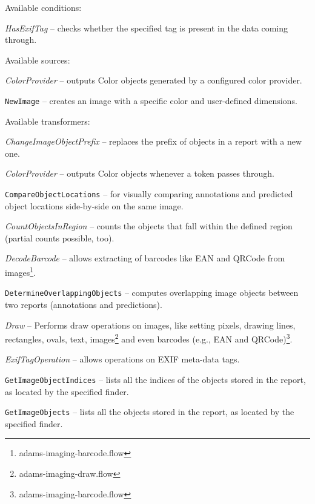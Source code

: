 \documentclass[a4paper]{book}
\begin{document}
\noindent Available conditions:
\begin{tight_itemize}
  \item \textit{HasExifTag} -- checks whether the specified tag is present in
  the data coming through.
\end{tight_itemize}

\noindent Available sources:
\begin{tight_itemize}
  \item \textit{ColorProvider} -- outputs Color objects generated by a
  configured color provider.
  \item \texttt{NewImage} -- creates an image with a specific color and
  user-defined dimensions.
\end{tight_itemize}

\noindent Available transformers:
\begin{tight_itemize}
  \item \textit{ChangeImageObjectPrefix} -- replaces the prefix of
  objects in a report with a new one.
  \item \textit{ColorProvider} -- outputs Color objects whenever a token
  passes through.
  \item \texttt{CompareObjectLocations} -- for visually comparing annotations
  and predicted object locations side-by-side on the same image.
  \item \textit{CountObjectsInRegion} -- counts the objects that fall
  within the defined region (partial counts possible, too).
  \item \textit{DecodeBarcode} -- allows extracting of barcodes like
  EAN and QRCode from images\footnote{adams-imaging-barcode.flow}.
  \item \texttt{DetermineOverlappingObjects} -- computes overlapping image objects
  between two reports (annotations and predictions).
  \item \textit{Draw} -- Performs draw operations on images, like setting
  pixels, drawing lines, rectangles, ovals, text, images\footnote{adams-imaging-draw.flow}
  and even barcodes (e.g., EAN and QRCode)\footnote{adams-imaging-barcode.flow}.
  \item \textit{ExifTagOperation} -- allows operations on EXIF meta-data tags.
  \item \texttt{GetImageObjectIndices} -- lists all the indices of the objects
  stored in the report, as located by the specified finder.
  \item \texttt{GetImageObjects} -- lists all the objects stored in the
  report, as located by the specified finder.

\end{tight_itemize}
\end{document}
